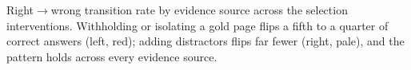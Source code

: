 \begin{table}[t]
\caption{Right$\rightarrow$wrong transition rate by evidence source across the selection interventions. Withholding or isolating a gold page flips a fifth to a quarter of correct answers (left, red); adding distractors flips far fewer (right, pale), and the pattern holds across every evidence source.}
\label{tab:selection_transitions}
\end{table}
